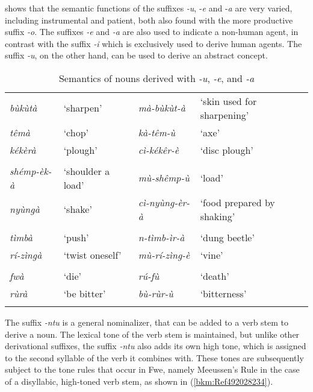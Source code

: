  shows that the semantic functions of the suffixes \textit{-u}, -\textit{e} and -\textit{a} are very varied, including instrumental and patient, both also found with the more productive suffix \textit{-o}. The suffixes \textit{-e} and \textit{-a} are also used to indicate a non-human agent, in contrast with the suffix \textit{-i} which is exclusively used to derive human agents. The suffix \textit{-u}, on the other hand, can be used to derive an abstract concept.

\begin{table}
\label{bkm:Ref98855670}\caption{\label{tab:4:15}Semantics of nouns derived with \textit{-u}, \textit{-e}, and \textit{-a}}

\begin{tabular}{llll}
\lsptoprule
\tablevspace
\multicolumn{4}{c}{Instrumental}\\
\midrule
\textit{bùkùtà} & ‘sharpen’ & \textit{mà-bùkùt-à} & ‘skin used for sharpening’\\
\textit{têmà} & ‘chop’ & \textit{kà-têm-ù} & ‘axe’\\
\textit{kékèrà} & ‘plough’ & \textit{cì-kékêr-è} & ‘disc plough’\\
\tablevspace
\multicolumn{4}{c}{Patient}\\
\midrule
\textit{shémp-èk-à} & ‘shoulder a load’ & \textit{mù-shêmp-ù} & ‘load’\\
\textit{nyùngà} & ‘shake’ & \textit{cì-nyùng-èr-à} & ‘food prepared by shaking’\\
\tablevspace
\multicolumn{4}{c}{Non-human agent}\\
\midrule
\textit{tìmbà} & ‘push’ & \textit{n-tìmb-ìr-à} & ‘dung beetle’\\
\textit{rí-zìngà} & ‘twist oneself’ & \textit{mù-rí-zìng-è} & ‘vine’\\
\tablevspace
\multicolumn{4}{c}{Abstract concept}\\
\midrule
\textit{fwà} & ‘die’ & \textit{rú-fù} & ‘death’\\
\textit{rùrà} & ‘be bitter’ & \textit{bù-rùr-ù} & ‘bitterness’\\
\lspbottomrule
\end{tabular}
\end{table}

The suffix \textit{-ntu} is a general nominalizer, that can be added to a verb stem to derive a noun. The lexical tone of the verb stem is maintained, but unlike other derivational suffixes, the suffix \textit{-ntu} also adds its own high tone, which is assigned to the second syllable of the verb it combines with. These tones are subsequently subject to the tone rules that occur in Fwe, namely Meeussen’s Rule in the case of a disyllabic, high-toned verb stem, as shown in (\ref{bkm:Ref492028234}).

